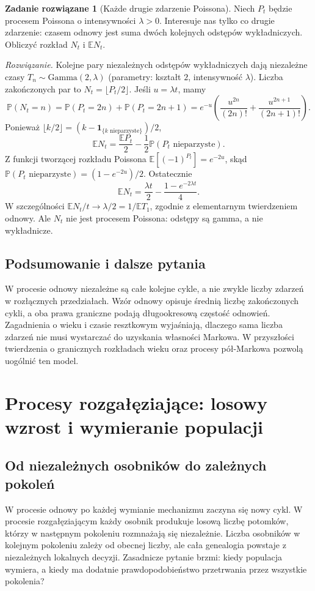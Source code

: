 \documentclass[11pt,a4paper,oneside]{report}
\numberwithin{equation}{chapter}
\theoremstyle{plain}
\theoremstyle{definition}
\newtheorem{zadanie}{Zadanie rozwiązane}[chapter]
\theoremstyle{remark}
\newcommand{\Prob}{\mathbb{P}}
\newcommand{\E}{\mathbb{E}}
\newcommand{\ind}[1]{\mathbf{1}_{#1}}
\begin{document}
\begin{zadanie}[Każde drugie zdarzenie Poissona]
Niech $P_t$ będzie procesem Poissona o intensywności $\lambda>0$.
Interesuje nas tylko co drugie zdarzenie: czasem odnowy jest
suma dwóch kolejnych odstępów wykładniczych. Obliczyć
rozkład $N_t$ i $\E N_t$.

\emph{Rozwiązanie.} Kolejne pary niezależnych
odstępów wykładniczych dają niezależne czasy
$T_n\sim\mathrm{Gamma}(2,\lambda)$ (parametry: kształt $2$,
intensywność $\lambda$). Liczba zakończonych par to
$N_t=\lfloor P_t/2\rfloor$. Jeśli $u=\lambda t$, mamy
\[
\Prob(N_t=n)=\Prob(P_t=2n)+\Prob(P_t=2n+1)
=e^{-u}\left(\frac{u^{2n}}{(2n)!}+
\frac{u^{2n+1}}{(2n+1)!}\right).
\]
Ponieważ $\lfloor k/2\rfloor=(k-\ind{\{k\text{ nieparzyste}\}})/2$,
\[
\E N_t=\frac{\E P_t}{2}-\frac12\Prob(P_t\text{ nieparzyste}).
\]
Z funkcji tworzącej rozkładu Poissona
$\E[(-1)^{P_t}]=e^{-2u}$, skąd
$\Prob(P_t\text{ nieparzyste})=(1-e^{-2u})/2$.
Ostatecznie
\[
\E N_t=\frac{\lambda t}{2}-\frac{1-e^{-2\lambda t}}{4}.
\]
W szczególności $\E N_t/t\to\lambda/2=1/\E T_1$,
zgodnie z elementarnym twierdzeniem odnowy.
Ale $N_t$ nie jest procesem Poissona: odstępy są gamma,
a nie wykładnicze.
\end{zadanie}

\section{Podsumowanie i dalsze pytania}
W procesie odnowy niezależne są całe kolejne cykle, a nie
zwykle liczby zdarzeń w rozłącznych przedziałach. Wzór
odnowy opisuje średnią liczbę zakończonych cykli, a oba
prawa graniczne podają długookresową częstość odnowień.
Zagadnienia o wieku i czasie resztkowym wyjaśniają, dlaczego
sama liczba zdarzeń nie musi wystarczać do uzyskania własności Markowa.
W przyszłości twierdzenia o granicznych rozkładach wieku
oraz procesy pół-Markowa pozwolą uogólnić ten model.


\chapter{Procesy rozgałęziające: losowy wzrost i wymieranie populacji}
\label{ch:branching}

\section{Od niezależnych osobników do zależnych pokoleń}
W procesie odnowy po każdej wymianie mechanizmu zaczyna się nowy
cykl. W procesie rozgałęziającym każdy osobnik produkuje losową
liczbę potomków, którzy w następnym pokoleniu rozmnażają się niezależnie.
Liczba osobników w kolejnym pokoleniu zależy od obecnej liczby,
ale cała genealogia powstaje z niezależnych lokalnych decyzji.
Zasadnicze pytanie brzmi: kiedy populacja wymiera, a kiedy ma
dodatnie prawdopodobieństwo przetrwania przez wszystkie pokolenia?
\end{document}
